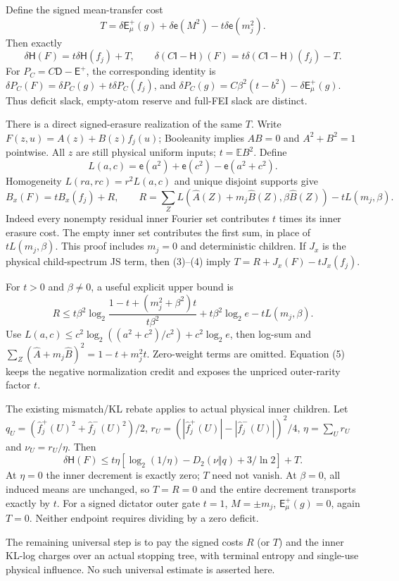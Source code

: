 \documentclass{article}
\newcommand{\HH}{\mathsf H}
\newcommand{\EE}{\mathsf E^+}
\newcommand{\II}{\mathsf I}
\newcommand{\DD}{\mathsf D}
\newcommand{\de}{\delta}
\newcommand{\eb}{\mathsf e}
\begin{document}
Define the signed mean-transfer cost
\[
 T=\de\EE_\mu(g)+\de\eb(M^2)-t\de\eb(m_j^2).
\]
Then exactly
\[
 \de\HH(F)=t\de\HH(f_j)+T,\qquad
 \de(C\II-\HH)(F)=t\de(C\II-\HH)(f_j)-T.
\tag{3}
\]
For $P_C=C\DD-\EE$, the corresponding identity is
$\de P_C(F)=\de P_C(g)+t\de P_C(f_j)$, and
$\de P_C(g)=C\beta^2(t-b^2)-\de\EE_\mu(g)$.
Thus deficit slack, empty-atom reserve and full-FEI slack are distinct.

There is a direct signed-erasure realization of the same $T$. Write
$F(z,u)=A(z)+B(z)f_j(u)$; Booleanity implies $AB=0$ and
$A^2+B^2=1$ pointwise. All $z$ are still physical uniform inputs;
$t=\mathbb EB^2$. Define
\[
 L(a,c)=\eb(a^2)+\eb(c^2)-\eb(a^2+c^2).
\]
Homogeneity $L(ra,rc)=r^2L(a,c)$ and unique disjoint supports give
\[
 B_x(F)=tB_x(f_j)+R,\qquad
 R=\sum_Z L(\widehat A(Z)+m_j\widehat B(Z),\beta\widehat B(Z))
                  -tL(m_j,\beta).
\tag{4}
\]
Indeed every nonempty residual inner Fourier set contributes $t$ times
its inner erasure cost. The empty inner set contributes the first sum,
in place of $tL(m_j,\beta)$. This proof includes $m_j=0$ and
deterministic children. If $J_x$ is the physical child-spectrum JS term,
then (3)--(4) imply $T=R+J_x(F)-tJ_x(f_j)$.

For $t>0$ and $\beta\ne0$, a useful explicit upper bound is
\[
 R\le t\beta^2\log_2\frac{1-t+(m_j^2+\beta^2)t}{t\beta^2}
       +t\beta^2\log_2 e-tL(m_j,\beta).
\tag{5}
\]
Use $L(a,c)\le c^2\log_2((a^2+c^2)/c^2)+c^2\log_2 e$,
then log-sum and $\sum_Z(\widehat A+m_j\widehat B)^2=1-t+m_j^2t$.
Zero-weight terms are omitted. Equation (5) keeps the negative
normalization credit and exposes the unpriced outer-rarity factor $t$.

The existing mismatch/KL rebate applies to actual physical inner children.
Let $q_U=(\widehat f_j^+(U)^2+\widehat f_j^-(U)^2)/2$,
$r_U=(|\widehat f_j^+(U)|-|\widehat f_j^-(U)|)^2/4$,
$\eta=\sum_U r_U$ and $\nu_U=r_U/\eta$. Then
\[
 \de\HH(F)\le
 t\eta\left[\log_2(1/\eta)-D_2(\nu\Vert q)+3/\ln2\right]+T.
\tag{6}
\]
At $\eta=0$ the inner decrement is exactly zero; $T$ need not vanish.
At $\beta=0$, all induced means are unchanged, so $T=R=0$ and
the entire decrement transports exactly by $t$. For a signed dictator
outer gate $t=1$, $M=\pm m_j$, $\EE_\mu(g)=0$, again $T=0$.
Neither endpoint requires dividing by a zero deficit.

The remaining universal step is to pay the signed costs $R$ (or $T$)
and the inner KL-log charges over an actual stopping tree, with terminal
entropy and single-use physical influence. No such universal estimate
is asserted here.
\end{document}
